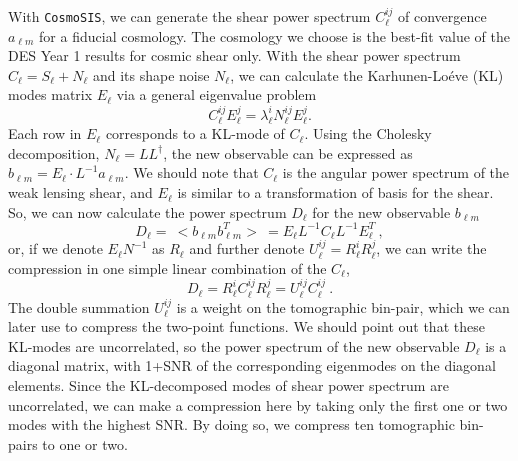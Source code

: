 \documentclass[twocolumn]{\docclass}
\newcommand\be{\begin{equation}}
\newcommand\ee{\end{equation}}
\begin{document}
	With  {\tt CosmoSIS}, we can generate the shear power spectrum $C_{\ell}^{ij}$ of convergence $a_{\ell m}$ for a fiducial cosmology. The cosmology we choose is the best-fit value of the DES Year 1 results for cosmic shear only. With the shear power spectrum $C_{\ell}=S_{\ell}+N_{\ell}$ and its shape noise $N_{\ell}$, we can calculate the Karhunen-Lo\'eve (KL) modes matrix $E_{\ell}$ via a general eigenvalue problem 
	\be
	C^{ij}_{\ell} E^j_{\ell} = \lambda^i_{\ell} N^{ij}_{\ell} E^j_{\ell}
	.\ee
	Each row in $E_{\ell}$ corresponds to a KL-mode of $C_{\ell}$. Using the Cholesky decomposition, $N_{\ell} = L L^{\dagger}$, the new observable can be expressed as $b_{\ell m} = E_{\ell} \cdot L^{-1} a_{\ell m}$. We should note that $C_{\ell}$ is the angular power spectrum of the weak lensing shear, and $E_{\ell}$ is similar to a transformation of basis for the shear. So, we can now calculate the power spectrum $D_{\ell}$ for the new observable $b_{\ell m}$ 
	\be
	D_{\ell} =\ <b_{\ell m} b_{\ell m}^T>\ = E_{\ell} L^{-1} C_{\ell} L^{-1} E^{T}_{\ell}\
	,\ee
	or, if we denote $E_{\ell} N^{-1}$ as $R_{\ell}$ and further denote $U_{\ell}^{ij}=R^i_{\ell} R^j_{\ell}$, we can write the compression in one simple linear combination of the $C_{\ell}$,
	\be
	D_{\ell} = R_{\ell}^i C_{\ell}^{ij} R_{\ell}^j = U_{\ell}^{ij} C_{\ell}^{ij}\
	.\ee
	The double summation $U_{\ell}^{ij}$ is a weight on the tomographic bin-pair, which we can later use to compress the two-point functions. We should point out that these KL-modes are uncorrelated, so the power spectrum of the new observable $D_{\ell}$ is a diagonal matrix, with 1+SNR of the corresponding eigenmodes on the diagonal elements. Since the KL-decomposed modes of shear power spectrum are uncorrelated, we can make a compression here by taking only the first one or two modes with the highest SNR. By doing so, we compress ten tomographic bin-pairs to one or two.
	
\end{document}
